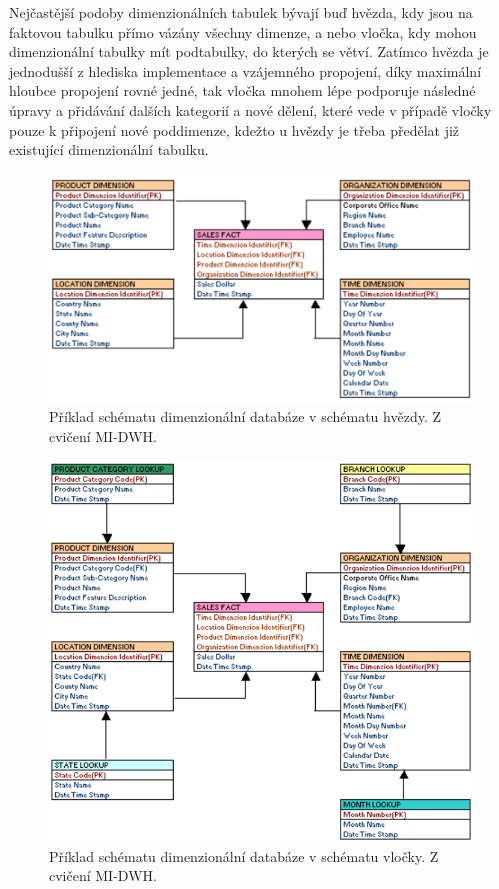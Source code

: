 \documentclass[thesis=M,czech]{FITthesis}[2022/10/08]
\begin{document}
Nejčastější podoby dimenzionálních tabulek bývají buď hvězda, kdy jsou na faktovou tabulku přímo vázány všechny dimenze, a nebo vločka, kdy mohou dimenzionální tabulky mít podtabulky, do kterých se větví. Zatímco hvězda je jednodušší z hlediska implementace a vzájemného propojení, díky maximální hloubce propojení rovné jedné, tak vločka mnohem lépe podporuje následné úpravy a přidávání dalších kategorií a nové dělení, které vede v případě vločky pouze k připojení nové poddimenze, kdežto u hvězdy je třeba předělat již existující dimenzionální tabulku.  

\begin{figure}
    \centering
    \includegraphics[width=\textwidth]{DP-obrazky/DD_hvezda.png}
    \caption{Příklad schématu dimenzionální databáze v schématu hvězdy. Z cvičení MI-DWH. \cite{EDW5}}
    \label{fig:Dim_Hvězda}
\end{figure}



\begin{figure}
    \centering
    \includegraphics[width=\textwidth]{DP-obrazky/DD_vlocka.png}
    \caption{Příklad schématu dimenzionální databáze v schématu vločky. Z cvičení MI-DWH. \cite{EDW5}}
    \label{fig:Dim_vločka}
\end{figure}
\end{document}
